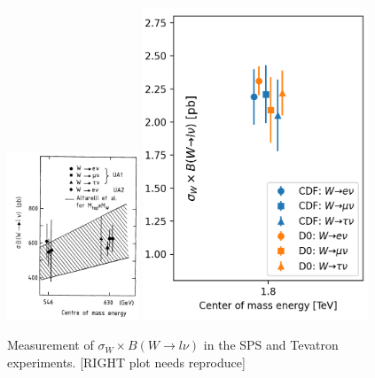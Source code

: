 \begin{figure}[ht]
    \centering
    \includegraphics[width=0.35\textwidth]{chapters/RelatedWorks/sectionLU/figures/SPS.png}
    \includegraphics[width=0.6\textwidth]{chapters/RelatedWorks/sectionLU/figures/tevatron.png}
    \caption{Measurement of $\sigma_W \times B(W\to l \nu)$ in the SPS \cite{Albajar:1988ka} and Tevatron experiments. [RIGHT plot needs reproduce] }
    \label{sec:relatedWorks:lu:W:spsTevatron}
\end{figure}

